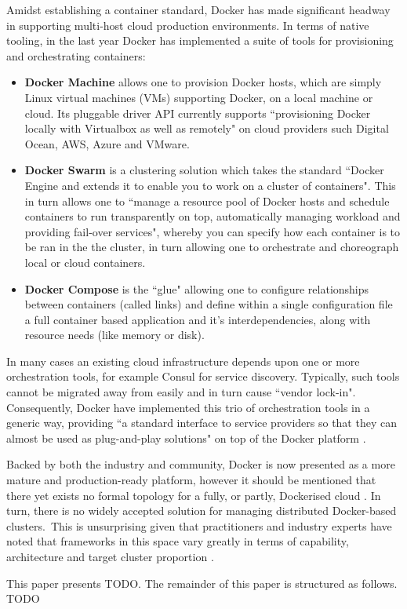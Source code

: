 \documentclass{article}
\begin{document}
\par
Amidst establishing a container standard, Docker has made significant headway in 
supporting multi-host cloud production environments. In terms of native tooling, in the last year Docker has implemented
a suite of tools for provisioning and orchestrating containers:
\begin{itemize}
\item \textbf{Docker Machine} allows one to provision Docker hosts, which are simply Linux virtual machines (VMs) supporting Docker, on a local machine or cloud. 
Its pluggable driver API currently supports ``provisioning Docker locally with Virtualbox as well as remotely" on cloud providers such Digital Ocean, AWS, Azure and VMware.
\item \textbf{Docker Swarm} is a clustering solution which takes the standard 
``Docker Engine and extends it to enable you to work on a cluster of containers". 
This in turn allows one to ``manage a resource pool of Docker hosts and schedule
containers to run transparently on top, automatically managing workload and providing fail-over services", whereby you can specify how each container is to be ran in the the cluster, in turn allowing one to orchestrate and choreograph local or cloud containers.
\item \textbf{Docker Compose} is the ``glue" allowing one to configure relationships between containers (called links) and define within a single configuration file a full container based application and it's interdependencies, along with resource needs (like memory or disk).
\end{itemize}
\noindent In many cases an existing cloud infrastructure depends upon one or more orchestration tools, for example 
Consul for service discovery. Typically, such tools cannot be migrated away from easily and in turn cause ``vendor lock-in".
Consequently, Docker have implemented this trio of orchestration tools in a generic way, 
providing ``a standard interface to service providers so that they can almost be used as plug-and-play solutions" on top of the Docker platform \citep{holla}.
\par
Backed by both the industry and community, Docker is now presented as a more mature and production-ready
platform, however it should be mentioned that there yet exists no
formal topology for a fully, or partly, Dockerised cloud \citep{Claus}. In 
turn, there is no widely accepted solution for managing distributed 
Docker-based clusters.\ This is unsurprising given that 
practitioners and industry experts have noted that frameworks in this space
vary greatly in terms of capability, architecture and target cluster proportion
\citep{goasguen, holla}.
\par
This paper presents TODO. The remainder of this paper is structured as follows. TODO
\end{document}
